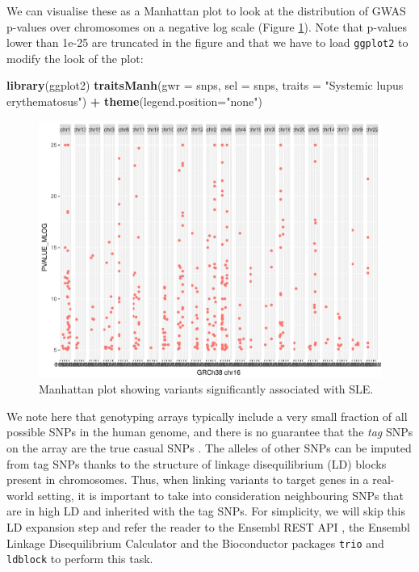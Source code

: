 \documentclass[9pt,a4paper,]{extarticle}
\newenvironment{Shaded}{\begin{snugshade}}{\end{snugshade}}
\newcommand{\KeywordTok}[1]{\textcolor[rgb]{0.13,0.29,0.53}{\textbf{#1}}}
\newcommand{\DataTypeTok}[1]{\textcolor[rgb]{0.13,0.29,0.53}{#1}}
\newcommand{\StringTok}[1]{\textcolor[rgb]{0.31,0.60,0.02}{#1}}
\newcommand{\OperatorTok}[1]{\textcolor[rgb]{0.81,0.36,0.00}{\textbf{#1}}}
\newcommand{\NormalTok}[1]{#1}
\begin{document}
We can visualise these as a Manhattan plot to look at the distribution of GWAS p-values over chromosomes on a negative log scale (Figure \ref{fig:manhattan}).
Note that p-values lower than 1e-25 are truncated in the figure and that we have to load \texttt{ggplot2} \citep{Wickham2009} to modify the look of the plot:

\begin{Shaded}
\begin{Highlighting}[]
\KeywordTok{library}\NormalTok{(ggplot2)}
\KeywordTok{traitsManh}\NormalTok{(}\DataTypeTok{gwr =}\NormalTok{ snps, }\DataTypeTok{sel =}\NormalTok{ snps, }\DataTypeTok{traits =} \StringTok{"Systemic lupus erythematosus"}\NormalTok{) }\OperatorTok{+}
\StringTok{  }\KeywordTok{theme}\NormalTok{(}\DataTypeTok{legend.position=}\StringTok{"none"}\NormalTok{)}
\end{Highlighting}
\end{Shaded}

\begin{figure}

{\centering \includegraphics{biocondutor-regulatory-genomics-workflow_files/figure-latex/manhattan-1} 

}

\caption{Manhattan plot showing variants significantly associated with SLE.}\label{fig:manhattan}
\end{figure}

We note here that genotyping arrays typically include a very small fraction of all possible SNPs in the human genome, and there is no guarantee that the \emph{tag} SNPs on the array are the true casual SNPs \citep{Bush2012}.
The alleles of other SNPs can be imputed from tag SNPs thanks to the structure of linkage disequilibrium (LD) blocks present in chromosomes.
Thus, when linking variants to target genes in a real-world setting, it is important to take into consideration neighbouring SNPs that are in high LD and inherited with the tag SNPs.
For simplicity, we will skip this LD expansion step and refer the reader to the Ensembl REST API \citep{Yates2015, Ensembl2017a}, the Ensembl Linkage Disequilibrium Calculator \citep{Ensembl2017b} and the Bioconductor packages \texttt{trio} \citep{Schwender2015} and \texttt{ldblock} \citep{Carey2017c} to perform this task.
\end{document}
